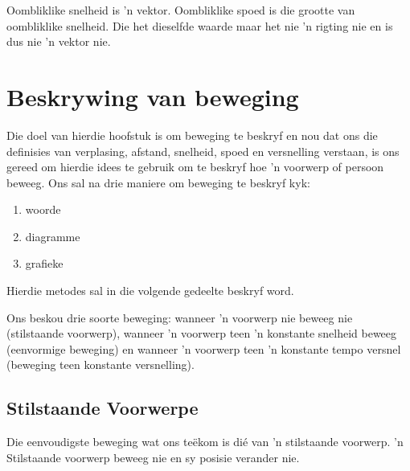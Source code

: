 
Oombliklike snelheid is 'n vektor. Oombliklike spoed is die grootte van oombliklike snelheid. Die het dieselfde waarde maar het nie 'n rigting nie en is dus nie 'n vektor nie.


\section{Beskrywing van beweging}

Die doel van hierdie hoofstuk is om beweging te beskryf en nou dat ons die definisies van verplasing, afstand, snelheid, spoed en versnelling verstaan, is ons gereed om hierdie idees te gebruik om te beskryf hoe 'n voorwerp of persoon beweeg. Ons sal na drie maniere  om beweging te beskryf kyk:\par 
\begin{enumerate}[noitemsep, label=\textbf{\arabic*}. ] 
    \item woorde
    \item diagramme
    \item grafieke
\end{enumerate}
Hierdie metodes sal in die volgende gedeelte beskryf word. \par 
Ons beskou drie soorte beweging: wanneer 'n voorwerp nie beweeg nie (stilstaande voorwerp), wanneer 'n voorwerp teen 'n konstante snelheid beweeg (eenvormige beweging) en wanneer 'n voorwerp teen 'n konstante tempo versnel (beweging teen konstante versnelling).\par 

\subsection*{Stilstaande Voorwerpe}
\nopagebreak
Die eenvoudigste beweging wat ons te\"ekom is di\'e van 'n stilstaande voorwerp. 'n Stilstaande voorwerp beweeg nie en sy posisie verander nie.

